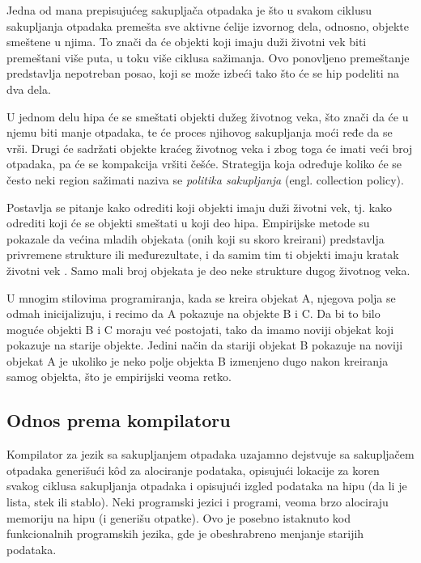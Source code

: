 Jedna od mana prepisujućeg sakupljača otpadaka je što u svakom ciklusu sakupljanja otpadaka premešta sve aktivne ćelije izvornog dela, odnosno, objekte smeštene u njima. To znači da će objekti koji imaju duži životni vek biti premeštani više puta, u toku više ciklusa sažimanja. Ovo ponovljeno premeštanje predstavlja nepotreban posao, koji se može izbeći tako što će se hip podeliti na dva dela.

U jednom delu hipa će se smeštati objekti dužeg životnog veka, što znači da će u njemu biti manje otpadaka, te će proces njihovog sakupljanja moći ređe da se vrši. Drugi će sadržati objekte kraćeg životnog veka i zbog toga će imati veći broj otpadaka, pa će se kompakcija vršiti češće. Strategija koja određuje koliko će se često neki region sažimati naziva se \textit{politika sakupljanja} (engl. collection policy).

Postavlja se pitanje kako odrediti koji objekti imaju duži životni vek, tj. kako odrediti koji će se objekti smeštati u koji deo hipa. Empirijske metode su pokazale da većina mladih objekata (onih koji su skoro kreirani) predstavlja privremene strukture ili međurezultate, i da samim tim ti objekti imaju kratak životni vek \cite{app87}. Samo mali broj objekata je deo neke strukture dugog životnog veka.

U mnogim stilovima programiranja, kada se kreira objekat A, njegova polja se odmah inicijalizuju, i recimo da A pokazuje na objekte B i C. Da bi to bilo moguće objekti B i C moraju već postojati, tako da imamo noviji objekat koji pokazuje na starije objekte. Jedini način da stariji objekat B pokazuje na noviji objekat A je ukoliko je neko polje objekta B izmenjeno dugo nakon kreiranja samog objekta, što je empirijski veoma retko.

\subsection{Odnos prema kompilatoru}

Kompilator za jezik sa sakupljanjem otpadaka uzajamno dejstvuje sa sakupljačem otpadaka generišući k\^od za alociranje podataka, opisujući lokacije za koren svakog ciklusa sakupljanja otpadaka i opisujući izgled podataka na hipu (da li je lista, stek ili stablo). Neki programski jezici i programi, veoma brzo alociraju memoriju na hipu (i generišu otpatke). Ovo je posebno istaknuto kod funkcionalnih programskih jezika, gde je obeshrabreno menjanje starijih podataka.

